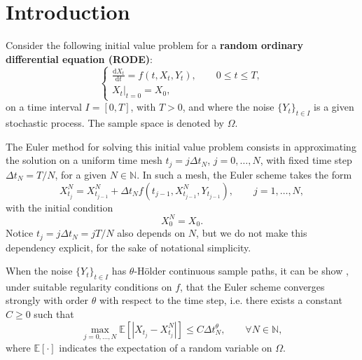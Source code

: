 \documentclass[reqno,12pt]{amsart}
\theoremstyle{plain}%
\theoremstyle{definition}
\begin{document}
\maketitle

\section{Introduction}

Consider the following initial value problem for a \textbf{random ordinary differential equation (RODE)}:
\begin{equation}
  \label{rodeeq}
  \begin{cases}
    \displaystyle \frac{\mathrm{d}X_t}{\mathrm{d} t} = f(t, X_t, Y_t), \qquad 0 \leq t \leq T, \\
    \left. X_t \right|_{t = 0} = X_0,
  \end{cases}
\end{equation}
on a time interval $I=[0, T]$, with $T > 0$, and where the noise $\{Y_t\}_{t\in I}$ is a given stochastic process. The sample space is denoted by $\Omega$.

The Euler method for solving this initial value problem consists in approximating the solution on a uniform time mesh $t_j = j\Delta t_N$, $j = 0, \ldots, N$, with fixed time step $\Delta t_N = T/N$, for a given $N\in \mathbb{N}$. In such a mesh, the Euler scheme takes the form
\begin{equation}
  \label{emscheme}
  X_{t_j}^N = X_{t_{j-1}}^N + \Delta t_N f(t_{j-1}, X_{t_{j-1}}^N, Y_{t_{j-1}}), \qquad j = 1, \ldots, N,
\end{equation}
with the initial condition
\begin{equation}
  \label{iccondition}
  X_0^N = X_0.
\end{equation}
Notice $t_j = j\Delta t_N = jT/N$ also depends on $N$, but we do not make this dependency explicit, for the sake of notational simplicity.

When the noise $\{Y_t\}_{t\in I}$ has $\theta$-H\"older continuous sample paths, it can be show \cite{GruneKloeden2001}, under suitable regularity conditions on $f$, that the Euler scheme converges strongly with order $\theta$ with respect to the time step, i.e. there exists a constant $C \geq 0$ such that
\begin{equation}
    \label{strongordertheta}
    \max_{j=0, \ldots, N}\mathbb{E}\left[ \left| X_{t_j} - X_{t_j}^N \right| \right] \leq C \Delta t_N^\theta, \qquad \forall N \in \mathbb{N},
\end{equation}
where $\mathbb{E}[\cdot]$ indicates the expectation of a random variable on $\Omega$.
\end{document}
